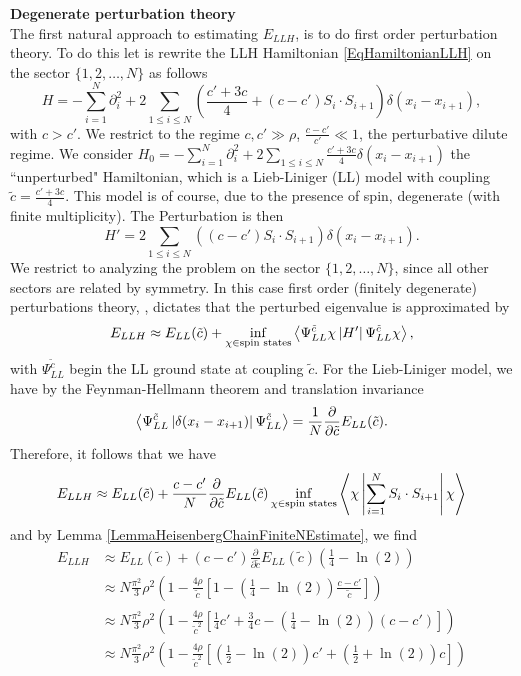 \textbf{Degenerate perturbation theory}\\
The first natural approach to estimating $ E_{LLH} $, is to do first order perturbation theory. To do this let is rewrite the LLH Hamiltonian \eqref{EqHamiltonianLLH} on the sector $ \{1,2,\ldots,N\} $ as follows\begin{equation}
H=-\sum_{i=1}^{N}\partial_i^2+2\sum_{1\leq i\leq N} \left(\frac{c'+3c}{4}+(c-c')S_i\cdot S_{i+1}\right)\delta(x_i-x_{i+1}),
\end{equation}
with $ c>c' $. We restrict to the regime $ c,c'\gg \rho $, $ \frac{c-c'}{c'}\ll 1 $, \ie the perturbative dilute regime.
We consider $ H_0=-\sum_{i=1}^{N}\partial_i^2+2\sum_{1\leq i\leq N} \frac{c'+3c}{4}\delta(x_i-x_{i+1}) $ the ``unperturbed" Hamiltonian, which is a Lieb-Liniger (LL) model with coupling $ \tilde{c}=\frac{c'+3c}{4} $. This model is of course, due to the presence of spin, degenerate (with finite multiplicity). The Perturbation is then 
$$ H'=2\sum_{1\leq i\leq N} \left((c-c')S_i\cdot S_{i+1}\right)\delta(x_i-x_{i+1}). $$
We restrict to analyzing the problem on the sector $ \{1,2,\ldots,N\} $, since all other sectors are related by symmetry.
In this case first order (finitely degenerate) perturbations theory, \cite{reed1978iv}, dictates that the perturbed eigenvalue is approximated by \begin{equation}
E_{LLH}\approx E_{LL}(\tilde{c})+\inf_{\chi\in\text{spin states}}\left\langle\Psi^{\tilde{c}}_{LL}\chi\left\vert H'\right\vert \Psi^{\tilde{c}}_{LL}\chi\right\rangle,
\end{equation}
with $ \Psi_{LL}^{\tilde{c}} $ begin the LL ground state at coupling $ \tilde{c} $. For the Lieb-Liniger model, we have by the Feynman-Hellmann theorem and translation invariance \begin{equation}
\left\langle\Psi^{\tilde{c}}_{LL}\left\vert\delta(x_i-x_{i+1})\right\vert \Psi^{\tilde{c}}_{LL}\right\rangle=\frac{1}{N}\frac{\partial}{\partial \tilde{c}}E_{LL}(\tilde{c}).
\end{equation}
Therefore, it follows that we have \begin{equation}
E_{LLH}\approx E_{LL}(\tilde{c})+\frac{c-c'}{N}\frac{\partial}{\partial \tilde{c}}E_{LL}(\tilde{c})\inf_{\chi\in\text{spin states}}\left\langle\chi\left\vert \sum_{i=1}^{N}S_i\cdot S_{i+1}\right\vert \chi\right\rangle
\end{equation}
and by Lemma \ref{LemmaHeisenbergChainFiniteNEstimate}, we find \begin{equation}
\begin{aligned}
E_{LLH}&\approx E_{LL}(\tilde{c})+(c-c')\frac{\partial}{\partial \tilde{c}}E_{LL}(\tilde{c})\left(\frac{1}{4}-\ln(2)\right)\\
&\approx N\frac{\pi^2}{3}\rho^2\left(1-\frac{4\rho}{\tilde{c}}\left[1-\left(\frac{1}{4}-\ln(2)\right)\frac{c-c'}{\tilde{c}}\right]\right)\\
&\approx N\frac{\pi^2}{3}\rho^2\left(1-\frac{4\rho}{\tilde{c}^2}\left[\frac{1}{4}c'+\frac{3}{4}c-\left(\frac{1}{4}-\ln(2)\right)(c-c')\right]\right)\\
&\approx N\frac{\pi^2}{3}\rho^2\left(1-\frac{4\rho}{\tilde{c}^2}\left[\left(\frac{1}{2}-\ln(2)\right)c'+\left(\frac{1}{2}+\ln(2)\right)c\right]\right)
\end{aligned}
\end{equation}
